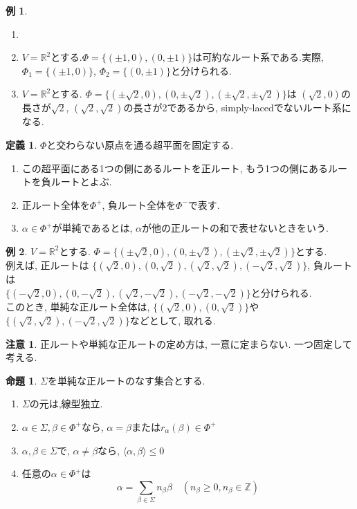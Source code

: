 \documentclass[a4,12pt, titlepage]{jarticle}
\theoremstyle{definition}
\newtheorem{df}{定義}
\newtheorem{prop}[thm]{命題}
\newtheorem*{ex}{例}
\newtheorem*{re}{注意}
\begin{document}
\begin{ex}
  \begin{enumerate}
    \item[]
    \item $ V = \mathbb{R}^2$とする.$ \Phi = \{ (\pm 1, 0), (0, \pm1) \}$は可約なルート系である.実際,
    $ \Phi_1 = \{ (\pm 1, 0)\}$, $ \Phi_2 = \{ (0, \pm 1)\}$と分けられる.
    \item $ V = \mathbb{R}^2$とする. $ \Phi = \{ (\pm \sqrt{2}, 0), (0, \pm\sqrt{2}), (\pm\sqrt{2}, \pm \sqrt{2}) \}$は
    $(\sqrt{2}, 0)$の長さが$\sqrt{2}$, $(\sqrt{2}, \sqrt{2})$の長さが2であるから, simply-lacedでないルート系になる.
  \end{enumerate}
\end{ex}

\begin{df}
  $\Phi$と交わらない原点を通る超平面を固定する. 
  \begin{enumerate}
    \item この超平面にある1つの側にあるルートを正ルート, もう1つの側にあるルートを負ルートとよぶ.
    \item 正ルート全体を$ \Phi^{+} $, 負ルート全体を$ \Phi^{-} $で表す. 
    \item $\alpha \in \Phi^{+} $が単純であるとは, $\alpha$が他の正ルートの和で表せないときをいう.
  \end{enumerate}
\end{df}

\begin{ex}
  $ V = \mathbb{R}^2$とする. $ \Phi = \{ (\pm \sqrt{2}, 0), (0, \pm\sqrt{2}), (\pm\sqrt{2}, \pm\sqrt{2}) \}$とする. \\
  例えば, 正ルートは $\{ ( \sqrt{2}, 0), (0, \sqrt{2}), (\sqrt{2}, \sqrt{2}), (-\sqrt{2}, \sqrt{2}) \}$, 負ルートは \\
  $\{ ( -\sqrt{2}, 0), (0, -\sqrt{2}), (\sqrt{2}, -\sqrt{2}), (-\sqrt{2}, -\sqrt{2}) \}$と分けられる.  \\
  このとき, 単純な正ルート全体は,  $\{ ( \sqrt{2}, 0), (0, \sqrt{2}) \}$や$ \{ (\sqrt{2}, \sqrt{2}), (-\sqrt{2}, \sqrt{2}) \}$などとして,
  取れる.
\end{ex}

\begin{re}
  正ルートや単純な正ルートの定め方は, 一意に定まらない. 一つ固定して考える.
\end{re}

\begin{prop}
  $\Sigma$を単純な正ルートのなす集合とする.
  \begin{enumerate} 
    \item $\Sigma$の元は,線型独立.
    \item $\alpha \in \Sigma, \beta \in \Phi^{+}$なら, $\alpha = \beta$または$r_{\alpha}(\beta) \in \Phi^{+}$
    \item $\alpha, \beta \in \Sigma $で, $\alpha \neq \beta $なら, $ \langle \alpha, \beta \rangle \leq 0 $
    \item 任意の$\alpha \in \Phi^{+}$は
    $$ \alpha = \sum_{ \beta \in \Sigma} n_{\beta} \beta \quad (n_{\beta} \geq 0, n_{\beta} \in \mathbb{Z}) $$
  \end{enumerate}
\end{prop}
\end{document}
